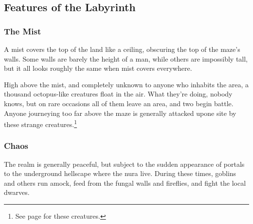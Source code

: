 \subsection{Features of the Labyrinth}
\subsubsection{The Mist}
A mist covers the top of the land like a ceiling, obscuring the top of the maze's walls.  Some walls are barely the height of a man, while others are impossibly tall, but it all looks roughly the same when mist covers everywhere.

High above the mist, and completely unknown to anyone who inhabits the area, a thousand octopus-like creatures float in the air.  What they're doing, nobody knows, but on rare occasions all of them leave an area, and two begin battle.  Anyone journeying too far above the maze is generally attacked upone site by these strange creatures.\footnote{See page \pageref{archmage} for these creatures.}

\subsubsection{Chaos}
The realm is generally peaceful, but subject to the sudden appearance of portals to the underground hellscape where the nura live.  During these times, goblins and others run amock, feed from the fungal walls and fireflies, and fight the local dwarves.


